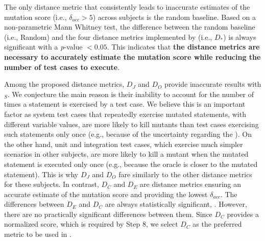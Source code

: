 The only distance metric that consistently leads to inaccurate estimates of the mutation score (i.e., $\delta_{acc}  > 5$) across subjects is the random baseline.
Based on a non-parametric Mann Whitney test, the difference between the random baseline (i.e., Random) and the four distance metrics implemented by \APPR (i.e., $D_*$) is always significant with a \textit{p}-value $< 0.05$. This indicates that \textbf{the \APPR distance metrics are necessary to accurately estimate the mutation score while reducing the number of test cases to  execute}.

Among the proposed distance metrics, 
$D_J$ and $D_O$ provide inaccurate results with \SAIL{}$_S$.
We conjecture the main reason is their inability to account for the number of times a statement is exercised by a test case. 
We believe this is an important factor as system test cases that repeatedly exercise mutated statements, with different variable values, are more likely to kill mutants than test cases exercising such statements only once (e.g., because of the uncertainty regarding the 
). On the other hand, unit and integration test cases, which exercise much simpler scenarios in other subjects, are more likely to kill a mutant when the mutated statement is executed only once (e.g., because the oracle is closer to the mutated statement). This is why $D_J$ and $D_O$ fare similarly to the other distance metrics for these subjects. 
In contrast, $D_C$ and $D_E$ are distance metrics ensuring an accurate estimate of the mutation score and providing the lowest $\delta_{acc}$. The differences between $D_E$ and $D_C$ are always statistically significant, . However, there are no practically significant differences between them. 
Since $D_C$ provides a normalized score, which is required by Step 8, we select $D_C$ as the preferred metric to be used in \APPR.



